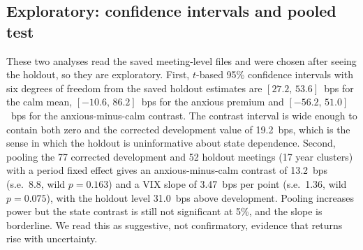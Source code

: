 \subsection{Exploratory: confidence intervals and pooled test}\label{sec:pooled}
These two analyses read the saved meeting-level files and were chosen after seeing the holdout, so they are exploratory. First, $t$-based 95\% confidence intervals with six degrees of freedom from the saved holdout estimates are $[27.2,\,53.6]$~bps for the calm mean, $[-10.6,\,86.2]$~bps for the anxious premium and $[-56.2,\,51.0]$~bps for the anxious-minus-calm contrast. The contrast interval is wide enough to contain both zero and the corrected development value of 19.2~bps, which is the sense in which the holdout is uninformative about state dependence. Second, pooling the 77 corrected development and 52 holdout meetings (17 year clusters) with a period fixed effect gives an anxious-minus-calm contrast of 13.2~bps (s.e.\ 8.8, wild $p=0.163$) and a VIX slope of 3.47~bps per point (s.e.\ 1.36, wild $p=0.075$), with the holdout level 31.0~bps above development. Pooling increases power but the state contrast is still not significant at 5\%, and the slope is borderline. We read this as suggestive, not confirmatory, evidence that returns rise with uncertainty.
